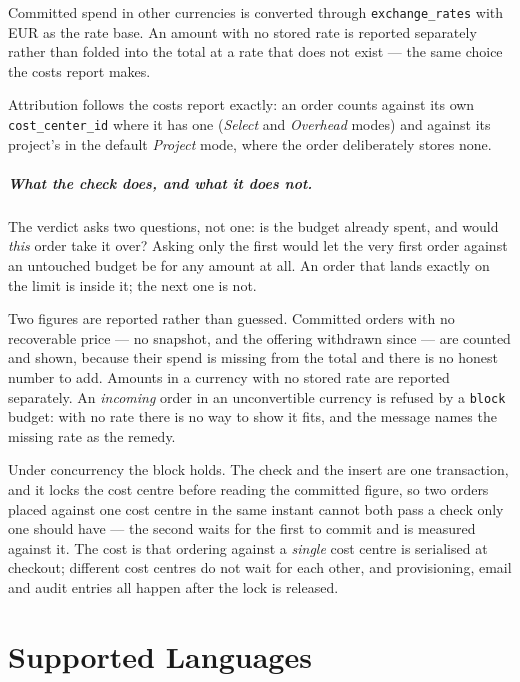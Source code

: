 \documentclass[12pt,a4paper,twoside]{report}
\newcommand{\code}[1]{\texttt{#1}}
\begin{document}
Committed spend in other currencies is converted through
\code{exchange\_rates} with EUR as the rate base. An amount with no
stored rate is reported separately rather than folded into the total at a
rate that does not exist --- the same choice the costs report makes.

Attribution follows the costs report exactly: an order counts against its
own \code{cost\_center\_id} where it has one (\emph{Select} and
\emph{Overhead} modes) and against its project's in the default
\emph{Project} mode, where the order deliberately stores none.

\paragraph{What the check does, and what it does not.}
The verdict asks two questions, not one: is the budget already spent,
and would \emph{this} order take it over? Asking only the first would let
the very first order against an untouched budget be for any amount at
all. An order that lands exactly on the limit is inside it; the next one
is not.

Two figures are reported rather than guessed. Committed orders with no
recoverable price --- no snapshot, and the offering withdrawn since ---
are counted and shown, because their spend is missing from the total and
there is no honest number to add. Amounts in a currency with no stored
rate are reported separately. An \emph{incoming} order in an
unconvertible currency is refused by a \code{block} budget: with no rate
there is no way to show it fits, and the message names the missing rate
as the remedy.

Under concurrency the block holds. The check and the insert are one
transaction, and it locks the cost centre before reading the committed
figure, so two orders placed against one cost centre in the same instant
cannot both pass a check only one should have --- the second waits for
the first to commit and is measured against it. The cost is that
ordering against a \emph{single} cost centre is serialised at checkout;
different cost centres do not wait for each other, and provisioning,
email and audit entries all happen after the lock is released.

\appendix

\chapter{Supported Languages}
\label{app:languages}
\end{document}
